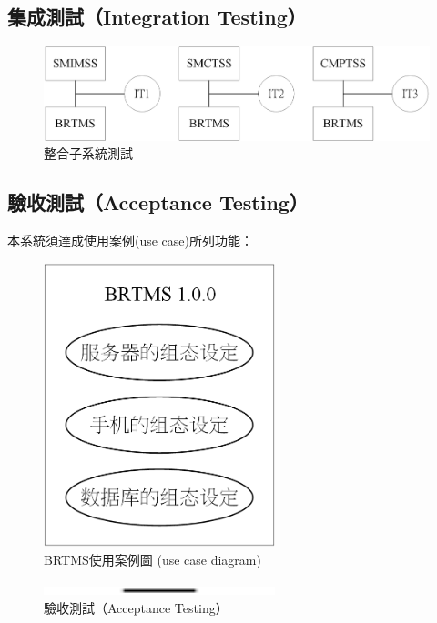  		\subsection{集成測試（Integration Testing）}
 			\begin{figure}[h]
				\centering
				\includegraphics[width = 1\textwidth]{IntegrationTesting.png}
				\caption{整合子系統測試}\label{IntegrationTesting}
			\end{figure}

		\subsection{驗收測試（Acceptance Testing）}
		本系統須達成使用案例(use case)所列功能：
			\begin{figure}[h]
				\centering
				\includegraphics[width = 0.6\textwidth]{usecasediagram.png}
				\caption{BRTMS使用案例圖 (use case diagram)}\label{usecasediagram}
			\end{figure}
			\begin{figure}[h]
				\centering
				\includegraphics[width = 0.6\textwidth]{AcceptanceTesting.png}
				\caption{驗收測試（Acceptance Testing）}\label{AcceptanceTesting}
			\end{figure}




